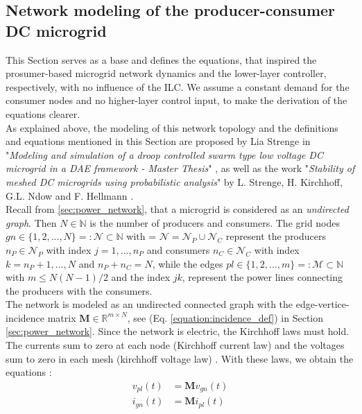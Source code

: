 \subsection{Network modeling of the producer-consumer DC microgrid}
\label{subsec:prod_cons_model}
This Section serves as a base and defines the equations, that inspired the prosumer-based microgrid network dynamics and the lower-layer controller, respectively, with no influence of the ILC. We assume a constant demand for the consumer nodes and no higher-layer control input, to make the derivation of the equations clearer. \\
As explained above, the modeling of this network topology and the definitions and equations mentioned in this Section are proposed by Lia Strenge in "\textit{Modeling and simulation of a droop controlled swarm
type low voltage DC microgrid in a DAE framework - Master Thesis}" \cite{lia_master}, as well as the work "\textit{Stability of meshed DC microgrids using
probabilistic analysis}" by L. Strenge, H. Kirchhoff, G.L. Ndow and F. Hellmann \cite{lia_stability}.
\\ Recall from \ref{sec:power_network}, that a microgrid is considered as an \textit{undirected graph}. Then $N \in \mathbb{N}$ is the number of producers and consumers. The grid nodes $gn \in \{1,2,...,N\} =: \mathcal{N} \subset \mathbb{N}$ with = $\mathcal{N} = \mathcal{N}_P \cup \mathcal{N}_C$ represent the producers $n_P \in \mathcal{N}_P$ with index $j = 1,...,n_P$  and consumers $n_C \in \mathcal{N}_C$ with index $k = n_P+1,...,N$ and $n_P + n_C = N$, while the edges $pl \in \{1,2,...,m\} =: \mathcal{M} \subset \mathbb{N}$ with $m \leq N(N-1)/2$ and the index $jk$, represent the power lines connecting the producers with the consumers. 
\\ The network is modeled as an undirected connected graph with the edge-vertice-incidence matrix $\boldsymbol{M} \in \mathbb{R}^{m \times N }$, see (Eq. \ref{equation:incidence_def}) in Section \ref{sec:power_network}. Since the network is electric, the Kirchhoff laws must hold. The currents sum to zero at each node (Kirchhoff current law) and the voltages sum to zero in each mesh (kirchhoff voltage law) \cite{lia_master}. With these laws, we obtain the equations \cite{lia_master}:
\setlength{\abovedisplayskip}{5pt}
\setlength{\belowdisplayskip}{5pt}
\setlength{\abovedisplayshortskip}{0pt}
\setlength{\belowdisplayshortskip}{0pt}
\begin{align}
    v_{pl}(t) &= \boldsymbol{M}v_{gn}(t) \label{eq:incv} \\
    i_{gn}(t) &= \boldsymbol{M}i_{pl}(t) \label{eq:inci}
\end{align}
